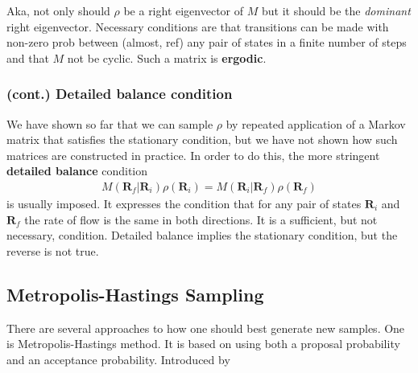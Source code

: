 \documentclass[twoside,english]{uiofysmaster}
\begin{document}
Aka, not only should $\rho$ be a right eigenvector of $M$ but it should be the \textit{dominant} right eigenvector. Necessary conditions are that transitions can be made with non-zero prob between (almost, ref) any pair of states in a finite number of steps and that $M$ not be cyclic. Such a matrix is \textbf{ergodic}. 

\subsubsection{(cont.) Detailed balance condition}
We have shown so far that we can sample $\rho$ by repeated application of a Markov matrix that satisfies the stationary condition, but we have not shown how such matrices are constructed in practice. In order to do this, the more stringent \textbf{detailed balance} condition
\begin{align}
	M(\bm{R}_f | \bm{R}_i ) \rho(\bm{R}_i) = M(\bm{R}_i | \bm{R}_f ) \rho(\bm{R}_f)
\end{align}
is usually imposed. 
It expresses the condition that for any pair of states $\bm{R}_i$ and $\bm{R}_f$ the rate of flow is the same in both directions. It is a sufficient, but not necessary, condition. Detailed balance implies the stationary condition, but the reverse is not true.

\cite{Umrigar1999}

\subsection{Metropolis-Hastings Sampling}
There are several approaches to how one should best generate new samples. One is Metropolis-Hastings method. It is based on using both a proposal probability and an acceptance probability. 
Introduced by \cite{Metropolis1953}
\end{document}
